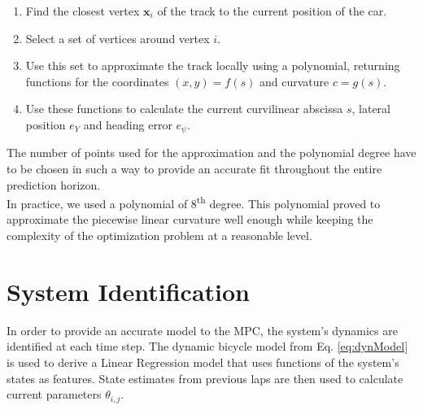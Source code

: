 \begin{enumerate}
\item Find the closest vertex $\bm{x}_i$ of the track to the current position of the car.
\item Select a set of vertices around vertex $i$.
\item Use this set to approximate the track locally using a polynomial, returning functions for the coordinates $(x,y)=f(s)$ and curvature $c=g(s)$.
\item Use these functions to calculate the current curvilinear abscissa $s$, lateral position $e_Y$ and heading error $e_\psi$.
\end{enumerate}
The number of points used for the approximation and the polynomial degree have to be chosen in such a way to provide an accurate fit throughout the entire prediction horizon.\\
In practice, we used a polynomial of 8\textsuperscript{th} degree. This polynomial proved to approximate the piecewise linear curvature well enough while keeping the complexity of the optimization problem at a reasonable level.

\section{System Identification}\label{sec:sysID}
In order to provide an accurate model to the MPC, the system's dynamics are identified at each time step. The dynamic bicycle model from Eq. \eqref{eq:dynModel} is used to derive a Linear Regression model that uses functions of the system's states as features. State estimates from previous laps are then used to calculate current parameters $\theta_{i,j}$.

